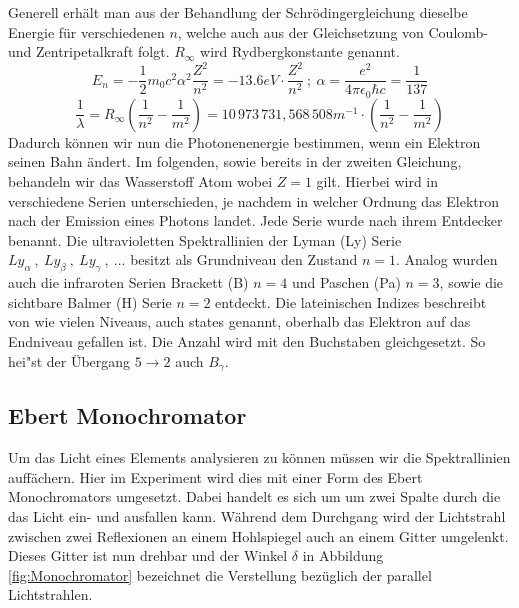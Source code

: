 \documentclass[]{article}
\begin{document}
Generell erhält man aus der Behandlung der Schrödingergleichung dieselbe Energie für verschiedenen $n$, welche auch aus der Gleichsetzung von Coulomb- und Zentripetalkraft folgt. $R_\infty$ wird Rydbergkonstante genannt. 
\begin{equation}\label{eq:Energieniveaus_H}
E_n = -\frac{1}{2} m_0 c^2 \alpha^2 \frac{Z^2}{n^2} = -13.6eV \cdot \frac{Z^2}{n^2} \: ; \: \alpha = \frac{e^2}{4\pi\epsilon_0 \hbar c} = \frac{1}{137}
\end{equation}
\begin{equation}\label{eq:rydberg}
\frac{1}{\lambda} = R_\infty \left(\frac{1}{n^2} - \frac{1}{m^2} \right)  = 10\,973\,731{,}568\,508 m^{-1} \cdot \left(\frac{1}{n^2} - \frac{1}{m^2} \right)
\end{equation}
Dadurch können wir nun die Photonenenergie bestimmen, wenn ein Elektron seinen Bahn ändert. Im folgenden, sowie bereits in der zweiten Gleichung, behandeln wir das Wasserstoff Atom wobei $Z=1$ gilt. Hierbei wird in verschiedene Serien unterschieden, je nachdem in welcher Ordnung das Elektron nach der Emission eines Photons landet. Jede Serie wurde nach ihrem Entdecker benannt. Die ultravioletten Spektrallinien der Lyman (Ly) Serie $Ly_\alpha \:,\: Ly_\beta \:,\: Ly_\gamma \:,\: ...$ besitzt als Grundniveau den Zustand $n=1$. Analog wurden auch die infraroten Serien Brackett (B) $n=4$ und Paschen (Pa) $n=3$, sowie die sichtbare Balmer (H) Serie $n=2$ entdeckt. 
Die lateinischen Indizes beschreibt von wie vielen Niveaus, auch states genannt, oberhalb das Elektron auf das Endniveau gefallen ist. Die Anzahl wird mit den  Buchstaben gleichgesetzt. So hei"st der \"Ubergang $5 \rightarrow 2$ auch $B_\gamma$.

\subsection{Ebert Monochromator}
Um das Licht eines Elements analysieren zu können müssen wir die Spektrallinien auffächern. Hier im Experiment wird dies mit einer Form des Ebert Monochromators umgesetzt. Dabei handelt es sich um um zwei  Spalte durch die das Licht ein- und ausfallen kann. Während dem Durchgang wird der Lichtstrahl zwischen zwei Reflexionen an einem Hohlspiegel auch an einem Gitter umgelenkt. Dieses Gitter ist nun drehbar und der Winkel $\delta$ in  Abbildung \ref{fig:Monochromator} bezeichnet die Verstellung bezüglich der parallel Lichtstrahlen. 
\end{document}
